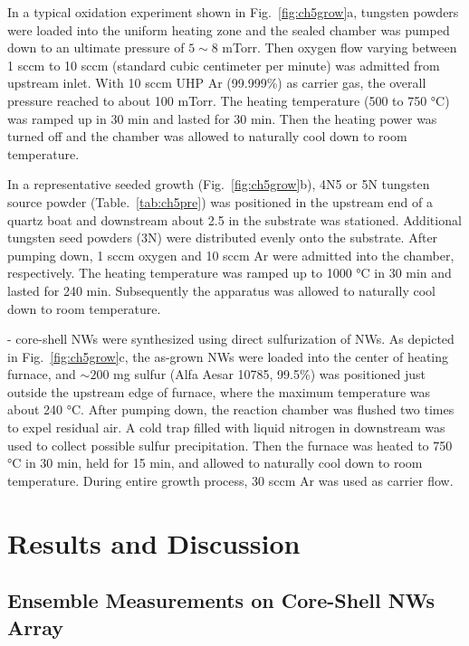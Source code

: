 In a typical oxidation experiment shown in Fig.~\ref{fig:ch5grow}a, tungsten powders were loaded into the uniform heating zone and the sealed chamber was pumped down to an ultimate pressure of $5\sim8$ mTorr. Then oxygen flow varying between 1 sccm to 10 sccm (standard cubic centimeter per minute) was admitted from upstream inlet. With 10 sccm UHP Ar (99.999\%) as carrier gas, the overall pressure reached to about 100 mTorr. The heating temperature (500 to 750 \si{\degreeCelsius}) was ramped up in 30 min and lasted for 30 min. Then the heating power was turned off and the chamber was allowed to naturally cool down to room temperature.

In a representative seeded growth (Fig.~\ref{fig:ch5grow}b), 4N5 or 5N tungsten source powder (Table.~\ref{tab:ch5pre}) was positioned in the upstream end of a quartz boat and downstream about 2.5 in the substrate was stationed. Additional tungsten seed powders (3N) were distributed evenly onto the substrate. After pumping down, 1 sccm oxygen and 10 sccm Ar were admitted into the chamber, respectively. The heating temperature was ramped up to 1000 \si{\degreeCelsius} in 30 min and lasted for 240 min. Subsequently the apparatus was allowed to naturally cool down to room temperature. 

- core-shell NWs were synthesized using direct sulfurization of  NWs. As depicted in Fig.~\ref{fig:ch5grow}c, the as-grown  NWs were loaded into the center of heating furnace, and $\sim200$ mg sulfur (Alfa Aesar 10785, 99.5\%) was positioned just outside the upstream edge of furnace, where the maximum temperature was about 240 \si{\degreeCelsius}. After pumping down, the reaction chamber was flushed two times to expel residual air. A cold trap filled with liquid nitrogen in downstream was used to collect possible sulfur precipitation. Then the furnace was heated to 750 \si{\degreeCelsius} in 30 min, held for 15 min, and allowed to naturally cool down to room temperature. During entire growth process, 30 sccm Ar was used as carrier flow.

\section{Results and Discussion}
\subsection{Ensemble Measurements on Core-Shell NWs Array}

